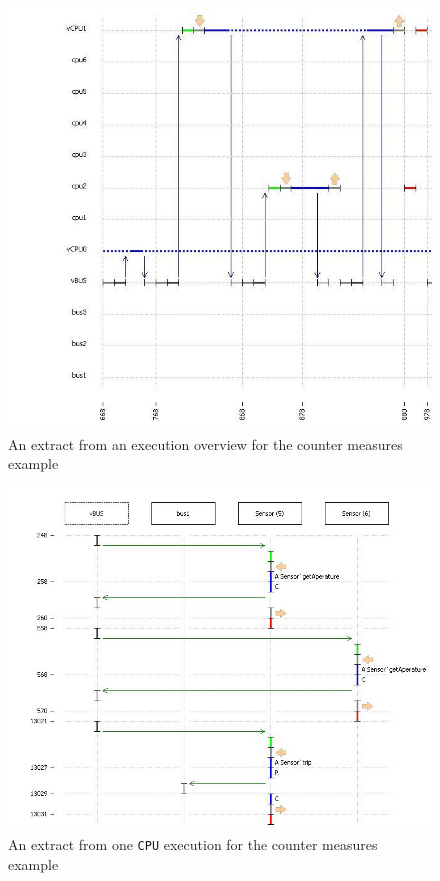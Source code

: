 \documentclass{overturerepchap}
\begin{document}
\begin{figure}
\begin{center}
\includegraphics[width=\textwidth]{figures/exeoverview.png}
\end{center}
\caption{An extract from an execution overview for the counter measures example\label{fig:exeoverview}}
\end{figure}

\begin{figure}
\begin{center}
\includegraphics[width=\textwidth]{figures/detailedexe.png}
\end{center}
\caption{An extract from one \texttt{CPU} execution for the counter measures example\label{fig:detailedexe}}
\end{figure}
\end{document}
